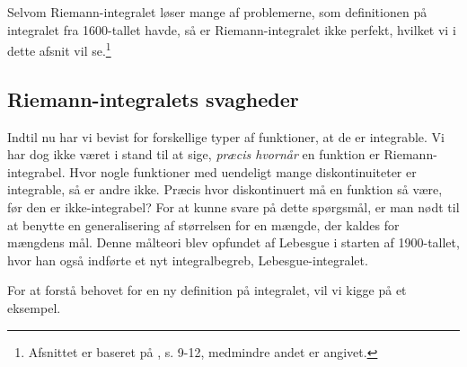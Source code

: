 Selvom Riemann-integralet løser mange af problemerne, som definitionen på integralet fra 1600-tallet havde, så er Riemann-integralet ikke perfekt, hvilket vi i dette afsnit vil se.\footnote{Afsnittet er baseret på \cite{Axler2020}, s. 9-12, medmindre andet er angivet.}

\subsection{Riemann-integralets svagheder}%
\label{sub:svagheder}
Indtil nu har vi bevist for forskellige typer af funktioner, at de er integrable.
Vi har dog ikke været i stand til at sige, \textit{præcis hvornår} en funktion er Riemann-integrabel.
Hvor nogle funktioner med uendeligt mange diskontinuiteter er integrable, så er andre ikke.
Præcis hvor diskontinuert må en funktion så være, før den er ikke-integrabel?
For at kunne svare på dette spørgsmål, er man nødt til at benytte en generalisering af størrelsen for en mængde, der kaldes for mængdens mål.
Denne målteori blev opfundet af Lebesgue i starten af 1900-tallet, hvor han også indførte et nyt integralbegreb, Lebesgue-integralet.

For at forstå behovet for en ny definition på integralet, vil vi kigge på et eksempel.

